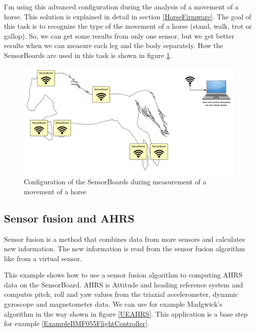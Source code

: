 I'm using this advanced configuration during the analysis of a movement of a horse. This solution is explained in detail in section \ref{HorseFirmware}. The goal of this task is to recognize the type of the movement of a horse (stand, walk, trot or gallop). So, we can get some results from only one sensor, but we get better results when we can measure each leg and the body separately. How the SensorBoards are used in this task is shown in figure \ref{UELoggingHorse}.

\begin{figure}
    \centering
    \label{UELoggingHorse}
    \caption{Configuration of the SensorBoards during measurement of a movement of a horse}
    \includegraphics[width=\linewidth]{img/UsageExamplesLoggerHorse.pdf}
\end{figure}

\subsection{Sensor fusion and \ac{AHRS}}
\label{ExampleAHRS}
Sensor fusion is a method that combines data from more sensors and calculates new information. The new information is read from the sensor fusion algorithm like from a virtual sensor. \cite{SensorFusion}

This example shows how to use a sensor fusion algorithm to computing \ac{AHRS} data on the SensorBoard. \ac{AHRS} is Attitude and heading reference system and computes pitch, roll and yaw values from the triaxial accelerometer, dynamic gyroscope and magnetometer data. We can use for example Madgwick's algorithm \cite{MadgwickAHRS} in the way shown in figure \ref{UEAHRS}. This application is a base step for example \ref{ExampleBMF055FlightController}.

